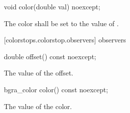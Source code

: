 \begin{itemdecl}
	void color(double val) noexcept;
\end{itemdecl}
\begin{itemdescr}
	\pnum
	\effects
	The color shall be set to the value of .
\end{itemdescr}

 [colorstops.colorstop.observers]{ observers}

\begin{itemdecl}
	double offset() const noexcept;
\end{itemdecl}
\begin{itemdescr}
	\pnum
	\returns
	The value of the offset.
\end{itemdescr}

\begin{itemdecl}
	bgra_color color() const noexcept;
\end{itemdecl}
\begin{itemdescr}
	\pnum
	\returns
	The value of the color.
\end{itemdescr}
